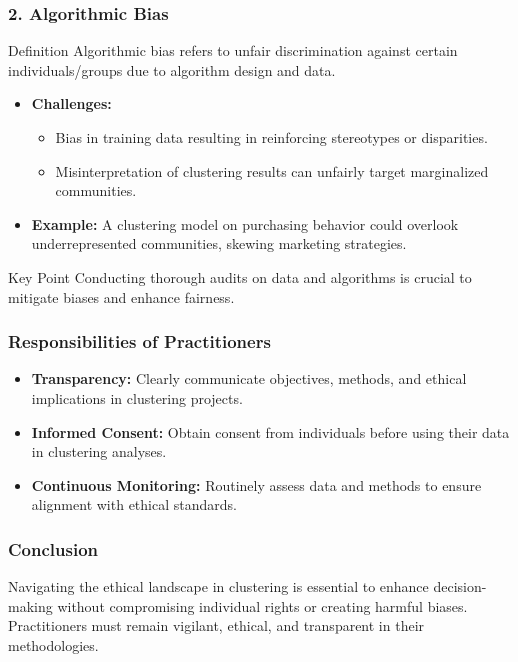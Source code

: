 \documentclass[aspectratio=169]{beamer}
\begin{document}
\begin{frame}[fragile]
    \frametitle{2. Algorithmic Bias}
    \begin{block}{Definition}
        Algorithmic bias refers to unfair discrimination against certain individuals/groups due to algorithm design and data.
    \end{block}
    \begin{itemize}
        \item \textbf{Challenges:}
        \begin{itemize}
            \item Bias in training data resulting in reinforcing stereotypes or disparities.
            \item Misinterpretation of clustering results can unfairly target marginalized communities.
        \end{itemize}
        \item \textbf{Example:}
        A clustering model on purchasing behavior could overlook underrepresented communities, skewing marketing strategies.
    \end{itemize}
    \begin{block}{Key Point}
        Conducting thorough audits on data and algorithms is crucial to mitigate biases and enhance fairness.
    \end{block}
\end{frame}

\begin{frame}[fragile]
    \frametitle{Responsibilities of Practitioners}
    \begin{itemize}
        \item \textbf{Transparency:} 
        Clearly communicate objectives, methods, and ethical implications in clustering projects.
        \item \textbf{Informed Consent:} 
        Obtain consent from individuals before using their data in clustering analyses.
        \item \textbf{Continuous Monitoring:} 
        Routinely assess data and methods to ensure alignment with ethical standards.
    \end{itemize}
\end{frame}

\begin{frame}[fragile]
    \frametitle{Conclusion}
    Navigating the ethical landscape in clustering is essential to enhance decision-making without compromising individual rights or creating harmful biases. 
    Practitioners must remain vigilant, ethical, and transparent in their methodologies.
\end{frame}
\end{document}
